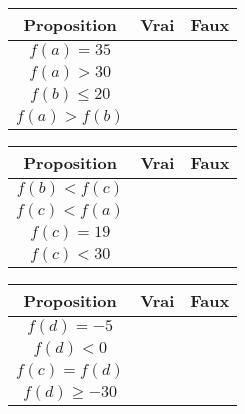 {\begin{center}
	\def\arraystretch{1.5}
	\setlength\tabcolsep{6pt}
	\begin{tabular}{|c|c|c|} \hline
		Proposition & Vrai & Faux \\ \hline
		$f(a) = 35$ & & \checkmark \\ \hline
		$f(a) > 30$ & \checkmark & \\ \hline
		$f(b) \leq 20$ & \checkmark & \\ \hline
		$f(a) > f(b)$ & \checkmark & \\ \hline
	\end{tabular}	
	\hfill
	\begin{tabular}{|c|c|c|} \hline
		Proposition & Vrai & Faux \\ \hline
		$f(b) < f(c)$ & \checkmark & \\ \hline
		$f(c) < f(a)$ & \checkmark & \\ \hline
		$f(c) = 19$ & & \checkmark \\ \hline
		$f(c) < 30$ & \checkmark & \\ \hline
	\end{tabular}
	\hfill
	\begin{tabular}{|c|c|c|} \hline
		Proposition & Vrai & Faux \\ \hline
		$f(d) = -5$ & & \checkmark \\ \hline
		$f(d) < 0$ & & \checkmark \\ \hline
		$f(c) = f(d)$ & & \checkmark \\ \hline
		$f(d) \geq -30$ & \checkmark & \\ \hline
	\end{tabular}	
	
	\end{center}

}




